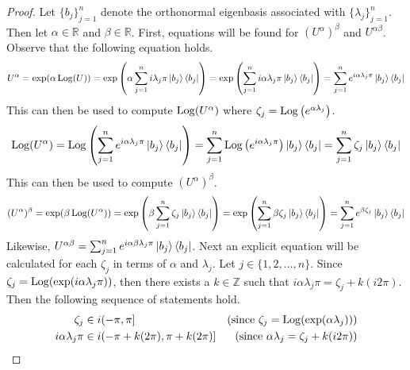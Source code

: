 \begin{proof}
    Let $\{ b_j \}_{j=1}^n$ denote the orthonormal eigenbasis associated with $\{ \lambda_j \}_{j=1}^n$.
    Then let $\alpha \in \mathbb{R}$ and $\beta \in \mathbb{R}$.
    First, equations will be found for $( U^\alpha )^\beta$ and $U^{\alpha\beta}$.
    Observe that the following equation holds.
    \begin{equation*}
        U^\alpha
        =
        \exp( \alpha\operatorname{Log}( U ) )
        =
        \exp\left( \alpha \sum_{j=1}^n i\lambda_j\pi \ket{b_j} \bra{b_j} \right)
        =
        \exp\left( \sum_{j=1}^n i\alpha\lambda_j\pi \ket{b_j} \bra{b_j} \right)
        =
        \sum_{j=1}^n e^{i\alpha\lambda_j\pi} \ket{b_j} \bra{b_j}
    \end{equation*}
    This can then be used to compute $\operatorname{Log}( U^\alpha )$ where $\zeta_j = \operatorname{Log}\left( e^{\alpha\lambda_j} \right)$.
    \begin{equation*}
        \operatorname{Log}( U^\alpha )
        =
        \operatorname{Log}\left( \sum_{j=1}^n e^{i\alpha\lambda_j\pi} \ket{b_j} \bra{b_j} \right)
        =
        \sum_{j=1}^n \operatorname{Log}\left( e^{i\alpha\lambda_j\pi} \right) \ket{b_j} \bra{b_j}
        =
        \sum_{j=1}^n \zeta_j \ket{b_j} \bra{b_j}
    \end{equation*}
    This can then be used to compute $( U^\alpha )^\beta$.
    \begin{equation*}
        ( U^\alpha )^\beta
        =
        \exp( \beta\operatorname{Log}( U^\alpha ) )
        =
        \exp\left( \beta \sum_{j=1}^n \zeta_j \ket{b_j} \bra{b_j} \right)
        =
        \exp\left( \sum_{j=1}^n \beta \zeta_j \ket{b_j} \bra{b_j} \right)
        =
        \sum_{j=1}^n e^{\beta\zeta_j} \ket{b_j} \bra{b_j}
    \end{equation*}
    Likewise, $U^{\alpha\beta} = \sum_{j=1}^n e^{i\alpha\beta\lambda_j\pi} \ket{b_j} \bra{b_j}$.
    Next an explicit equation will be calculated for each $\zeta_j$ in terms of $\alpha$ and $\lambda_j$.
    Let $j \in \{ 1, 2, \ldots, n \}$.
    Since $\zeta_j = \operatorname{Log}( \exp( i\alpha\lambda_j\pi ) )$, then there exists a $k \in \mathbb{Z}$ such that $i\alpha\lambda_j\pi = \zeta_j + k(i2\pi)$.
    Then the following sequence of statements hold.
    \begin{align*}
        \zeta_j
        &\in
        i( -\pi, \pi ]
        &
        ( \text{since } \zeta_j = \Log( \exp( \alpha\lambda_j ) ) )
        \\
        i\alpha\lambda_j\pi
        &\in
        i( -\pi + k(2\pi), \pi + k(2\pi) ]
        &
        ( \text{since } \alpha\lambda_j = \zeta_j + k(i2\pi) )

\end{align*}
\end{proof}
